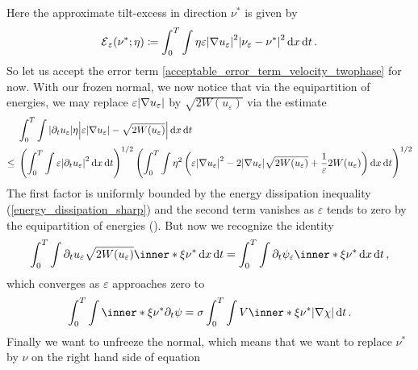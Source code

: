 Here the approximate tilt-excess in direction $ \nu^{ \ast } $ is given by
\begin{equation*}
	\tilt_excess_{ \varepsilon } ( \nu^{ \ast } ; \eta )
	\coloneqq
	\int_{ 0 }^{ T }
	\int
	\eta
	\varepsilon 
	\abs{ \nabla u_{ \varepsilon } }^{ 2 }
	\abs{ \nu_{ \varepsilon } - \nu^{ \ast } }^{ 2 }
	\dd{ x }
	\dd{ t }.
\end{equation*}
So let us accept the error term \ref{acceptable_error_term_velocity_twophase} 
for now.
With our frozen normal, we now notice that via the equipartition of energies, 
we may replace $ \varepsilon \abs{ \nabla u_{ \varepsilon } } $ by $ \sqrt{ 2 W 
( u_{ \varepsilon } ) } $ via the estimate
\begin{align*}
	& 
	\int_{ 0 }^{ T }
	\int
	\abs{ \partial_{ t } u_{ \varepsilon } } \eta
	\abs{ \varepsilon \abs{ \nabla u_{ \varepsilon } } - \sqrt{ 2 W ( u_{ 
	\varepsilon } ) } }
	\dd{ x }
	\dd{ t }
	\\
	\leq{} &
	\left(
	\int_{ 0 }^{ T }
	\int
	\varepsilon 
	\abs{ \partial_{ t } u_{ \varepsilon } }^{ 2 }
	\dd{ x }
	\dd{ t }
	\right)^{ 1/2 }
	\left(
	\int_{ 0 }^{ T }
	\int
	\eta^{ 2 }
	\left(
	\varepsilon \abs{ \nabla u_{ \varepsilon } }^{ 2 }
	-
	2 \abs{ \nabla u_{ \varepsilon } } \sqrt{ 2 W ( u_{ \varepsilon } ) }
	+
	\frac{ 1 }{ \varepsilon }
	2 W ( u_{ \varepsilon } ) 
	\right)
	\dd{ x }
	\dd{ t }
	\right)^{ 1 / 2 }
\end{align*}
The first factor is uniformly bounded by the energy dissipation inequality 
(\ref{energy_dissipation_sharp}) and the second term vanishes as $ \varepsilon 
$ tends to zero by the equipartition of energies 
().
But now we recognize the identity
\begin{equation*}
	\int_{ 0 }^{ T }
	\int
	\partial_{ t } u_{ \varepsilon }
	\sqrt{ 2 W ( u_{ \varepsilon } ) }
	\inner*{ \xi }{ \nu^{ \ast } }
	\dd{ x }
	\dd{ t }
	=
	\int_{ 0 }^{ T }
	\int
	\partial_{ t } \psi_{ \varepsilon }
	\inner*{ \xi }{ \nu^{ \ast } }
	\dd{ x }
	\dd{ t },
\end{equation*}
which converges as $ \varepsilon $ approaches zero to 
\begin{equation}
	\label{rewriting_limit_of_frozen_velocity_term}
	\int_{ 0 }^{ T }
	\int
	\inner*{ \xi }{ \nu^{ \ast } }
	\partial_{ t } \psi
	=
	\sigma
	\int_{ 0 }^{ T }
	\int
	V \inner*{ \xi }{ \nu^{ \ast } }
	\abs{ \nabla \chi }
	\dd{ t }.
\end{equation}
Finally we want to unfreeze the normal, which means that we want to replace $ 
\nu^{ \ast } $ by $ \nu $ on the right hand side of equation 
